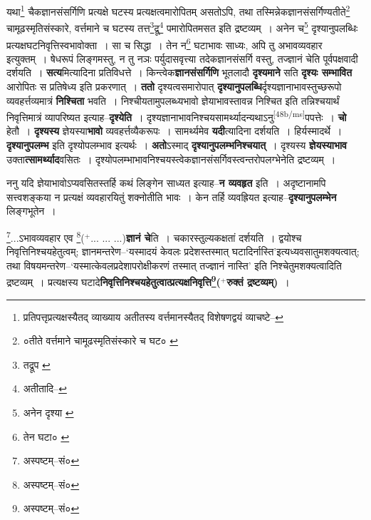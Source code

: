 \documentclass[article,12pt,a4paper]{memoir}
\newcommand{\add}[1]{($^{+}$#1)}
\begin{document}
	यथा\footnote{प्रतिपत्तृप्रत्यक्षस्यैतद् व्याख्याय अतीतस्य वर्त्तमानस्यैतद् विशेषणद्वयं व्याचष्टे--\cite{dp-msD-n}} चैकज्ञानसंसर्गिणि प्रत्यक्षे घटस्य प्रत्यक्षत्वमारोपितम् असतोऽपि, तथा तस्मिन्नेकज्ञानसंसर्गिण्यतीते\footnote{०तीते वर्त्तमाने चामूढस्मृतिसंस्कारे च घट० \cite{dp-msA} \cite{dp-msB} \cite{dp-msC} \cite{dp-msD} \cite{dp-edP} \cite{dp-edH} \cite{dp-edN}} चामूढस्मृतिसंस्कारे, वर्त्तमाने च घटस्य तत्त\footnote{तद्रूप \cite{dp-msA} \cite{dp-msB} \cite{dp-edP} \cite{dp-edH} \cite{dp-edE} \cite{dp-edN}}द्रू\footnote{अतीतादि--\cite{dp-msD-n}} पमारोपितमसत इति द्रष्टव्यम् । अनेन च\footnote{अनेन दृश्या \cite{dp-msA} \cite{dp-msB} \cite{dp-edP} \cite{dp-edH} \cite{dp-edE} \cite{dp-edN}} दृश्यानुपलब्धिः प्रत्यक्षघटनिवृत्तिस्वभावोक्ता । सा च सिद्धा । तेन न\footnote{तेन घटा० \cite{dp-msB}} घटाभावः साध्यः, अपि तु अभावव्यवहार इत्युक्तम् । षेधरूपं लिङ्गमस्तु, न तु नञः पर्युदासवृत्त्या तदेकज्ञानसंसर्गि वस्तु, तज्ज्ञानं चेति पूर्वपक्षवादी दर्शयति । \textbf{सत्य}मित्यादिना प्रतिविधत्ते । किन्त्वेक\textbf{ज्ञानसंसर्गिणि} भूतलादौ \textbf{दृश्यमाने} सति \textbf{दृश्यः सम्भावित} आरोपितः स प्रतिषेध्य इति प्रकरणात् । \textbf{ततो} दृश्यत्वसमारोपात् \textbf{दृश्यानुपलब्धि}र्दृश्यज्ञानाभावस्तुच्छरूपो व्यवहर्त्तव्यमात्रं \textbf{निश्चिता} भवति । निश्चीयतामुपलब्ध्यभावो ज्ञेयाभावस्तावन्न निश्चित इति तन्निश्चयार्थं निवृत्तिमात्रं व्यापरिष्यत इत्याह--\textbf{दृश्येति} । दृश्यज्ञानाभावनिश्चयसामर्थ्यादन्यथाऽनु\leavevmode\textsuperscript{\rmlatinfont\tiny [48b/ms]}पपत्तेः । \textbf{चो} हेतौ । \textbf{दृश्यस्य} ज्ञेयस्या\textbf{भावो} व्यवहर्त्तव्यैकरूपः । सामर्थ्यमेव \textbf{यदी}त्यादिना दर्शयति । हिर्यस्मादर्थे । \textbf{दृश्यानुपलम्भ} इति दृश्योपलम्भाव इत्यर्थः । \textbf{अतो}ऽस्माद् \textbf{दृश्यानुपलम्भनिश्चयात्} । दृश्यस्य \textbf{ज्ञेयस्याभाव} उक्ता\textbf{त्सामर्थ्याद}वसितः । दृश्योपलम्भाभावनिश्चयस्त्वेकज्ञानसंसर्गिवस्त्वन्तरोपलग्भेनेति द्रष्टव्यम् ।
	\pend
      

	  \pstart ननु यदि ज्ञेयाभावोऽप्यवसितस्तर्हि कथं लिङ्गेन साध्यत इत्याह--\textbf{न व्यवहृत} इति । अदृष्टानामपि सत्त्वशङ्कया न प्रत्यक्षं व्यवहारयितुं शक्नोतीति भावः । केन तर्हि व्यवह्रियत इत्याह--\textbf{दृश्यानुपलम्भेन} लिङ्गभूतेन ।
	\pend
      

	  \pstart \footnote{अस्पष्टम्--सं०}...ऽभावव्यवहार एव \footnote{अस्पष्टम्--सं०}\add{... ... ...}\textbf{ज्ञानं चे}ति । चकारस्तुल्यकक्षतां दर्शयति । द्वयोश्च निवृत्तिनिश्चयहेतुत्वम्; ज्ञानमन्तरेण--‘यस्मादयं केवलः प्रदेशस्तस्मात् घटादिर्नास्ति’इत्यध्यवसातुमशक्यत्वात्; तथा विषयमन्तरेण--‘यस्मात्केवलप्रदेशापरोक्षीकरणं तस्मात् तज्ज्ञानं नास्ति’ इति निश्चेतुमशक्यत्वादिति द्रष्टव्यम् । प्रत्यक्षस्य घटादे\textbf{निवृत्तिनिश्चयहेतुत्वात्प्रत्यक्षनिवृत्ति\footnote{अस्पष्टम्--सं०}\add{रुक्तं द्रष्टव्यम्}} ।
	\pend
      
\end{document}
